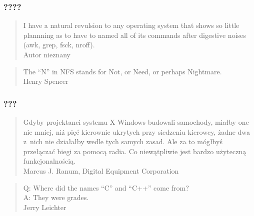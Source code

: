 \documentclass[10pt,t]{beamer}
\begin{document}
\begin{frame}
  \frametitle{????}









  \begin{quote}

    I have a natural revulsion to any operating system that shows so little
    plannning as to have to named all of its commands after digestive
    noises (awk, grep, fsck, nroff). \\
    Autor nieznany

  \end{quote}

  \vspace{2em}





  \begin{quote}

    The ``N'' in NFS stands for Not, or Need, or perhaps Nightmare. \\
    Henry Spencer

  \end{quote}

\end{frame}





\begin{frame}
  \frametitle{???}


  \begin{quote}

    Gdyby projektanci systemu X Windows budowali samochody, miałby one nie
    mniej, niż pięć kierownic ukrytych przy siedzeniu kierowcy, żadne dwa
    z~nich nie działałby wedle tych samych zasad. Ale za to mógłbyś
    przełączać biegi za pomocą radia. Co niewątpliwie jest bardzo użyteczną
    funkcjonalnością. \\
    Marcus J. Ranum, Digital Equipment Corporation

  \end{quote}

  \vspace{2em}





  \begin{quote}

    Q: Where did the names ``C'' and ``C++'' come from? \\
    A: They were grades. \\
    Jerry Leichter

  \end{quote}

\end{frame}
\end{document}
